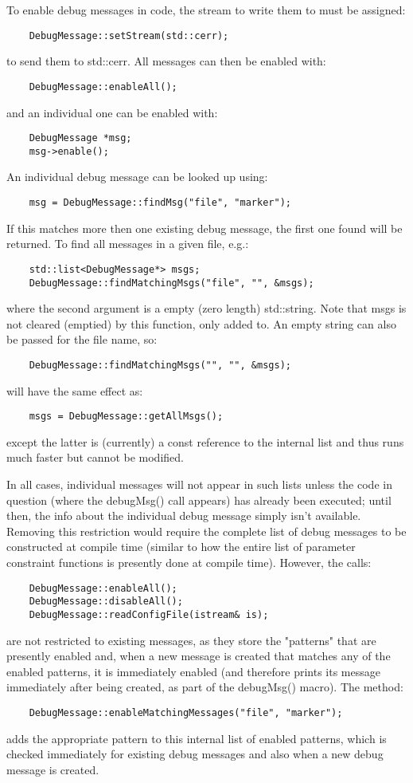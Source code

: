 \documentclass[10pt, letterpaper, twoside]{article}
\begin{document}
To enable debug messages in code, the stream to write them to must be
assigned:
\begin{verbatim}
	DebugMessage::setStream(std::cerr);
\end{verbatim}
to send them to std::cerr.  All messages can then be enabled with:
\begin{verbatim}
	DebugMessage::enableAll();
\end{verbatim}
and an individual one can be enabled with:
\begin{verbatim}
	DebugMessage *msg;
	msg->enable();
\end{verbatim}
An individual debug message can be looked up using:
\begin{verbatim}
	msg = DebugMessage::findMsg("file", "marker");
\end{verbatim}
If this matches more then one existing debug message, the first one
found will be returned.  To find all messages in a given file, e.g.:
\begin{verbatim}
	std::list<DebugMessage*> msgs;
	DebugMessage::findMatchingMsgs("file", "", &msgs);
\end{verbatim}
where the second argument is a empty (zero length) std::string.
Note that msgs is not cleared (emptied) by this function, only added
to.  An empty string can also be passed for the file name, so:
\begin{verbatim}
	DebugMessage::findMatchingMsgs("", "", &msgs);
\end{verbatim}
 will have the same effect as:
\begin{verbatim}
	msgs = DebugMessage::getAllMsgs();
\end{verbatim}
except the latter is (currently) a const reference to the internal
list and thus runs much faster but cannot be modified.

In all cases, individual messages will not appear in such lists unless
the code in question (where the debugMsg() call appears) has already
been executed; until then, the info about the individual debug message
simply isn't available.  Removing this restriction would require the
complete list of debug messages to be constructed at compile time
(similar to how the entire list of parameter constraint functions is
presently done at compile time).  However, the calls:
\begin{verbatim}
	DebugMessage::enableAll();
	DebugMessage::disableAll();
	DebugMessage::readConfigFile(istream& is);
\end{verbatim}
are not restricted to existing messages, as they store the
"patterns" that are presently enabled and, when a new message is
created that matches any of the enabled patterns, it is immediately
enabled (and therefore prints its message immediately after being
created, as part of the debugMsg() macro).  The method:
\begin{verbatim}
	DebugMessage::enableMatchingMessages("file", "marker");
\end{verbatim}
adds the appropriate pattern to this internal list of enabled
patterns, which is checked immediately for existing debug messages and
also when a new debug message is created.
\end{document}
